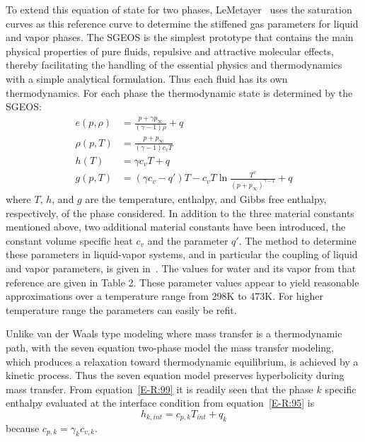 To extend this equation of state for two phases,
LeMetayer~\cite{SGEOS} uses the saturation curves as this
reference curve to determine the stiffened gas parameters for liquid
and vapor phases.  The SGEOS is the simplest prototype that contains
the main physical properties of pure fluids, repulsive and attractive
molecular effects, thereby facilitating the handling of the essential
physics and thermodynamics with a simple analytical formulation.  Thus
each fluid has its own thermodynamics.  For each phase the
thermodynamic state is determined by the SGEOS:
\begin{align}
  \label{E-R:97}
  e(p,\rho) &= \frac{p+\gamma p_{\infty}}{(\gamma -1) \rho} + q
  \\
  \label{E-R:98}
  \rho (p,T) &= \frac{p+p_{\infty}}{(\gamma -1) c_v T}
  \\
  \label{E-R:99}
  h(T) &= \gamma  c_v T + q
  \\
  \label{E-R:100}
  g(p,T) &= \left(\gamma c_v - q'\right) T - c_v T \ln \frac{T^\gamma}{\left(p+p_{\infty}\right)^{\gamma-1}} + q
\end{align}
where $T$, $h$, and $g$ are the temperature, enthalpy,
and Gibbs free enthalpy, respectively, of the phase considered.  In
addition to the three material constants mentioned above, two
additional material constants have been introduced, the constant
volume specific heat $c_v$ and the parameter $q'$.  The method to
determine these parameters in liquid-vapor systems, and in particular
the coupling of liquid and vapor parameters, is given
in~\cite{SGEOS}.  The values for water and its vapor from that
reference are given in Table 2.  These parameter values appear to
yield reasonable approximations over a temperature range from 298K to
473K.  For higher temperature range the parameters can easily be
refit.

Unlike van der Waals type modeling where mass transfer is a
thermodynamic path, with the seven equation two-phase model the mass
transfer modeling, which produces a relaxation toward thermodynamic
equilibrium, is achieved by a kinetic process.  Thus the seven equation
model preserves hyperbolicity during mass transfer.
From equation~\eqref{E-R:99} it is readily seen that the phase
$k$ specific enthalpy evaluated at the interface condition from
equation~\eqref{E-R:95} is
\begin{equation}
  h_{k,  int} = c_{p, k}  T_{int} + q_k
\end{equation}
because $c_{p, k} = \gamma_k  c_{v, k}$.

